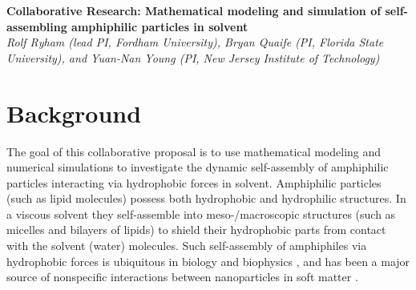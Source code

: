 \noindent
{\bf Collaborative Research: Mathematical modeling and simulation of
self-assembling amphiphilic particles in solvent} \\
{\em Rolf Ryham (lead PI, Fordham University), Bryan Quaife (PI,
Florida State University), and Yuan-Nan Young (PI, New Jersey Institute of Technology)}
\section{Background}
\label{sec:background}
The goal of this collaborative proposal is to use mathematical modeling
and numerical simulations to investigate the dynamic self-assembly of
amphiphilic particles interacting via hydrophobic forces
in solvent. Amphiphilic particles (such as lipid molecules) possess
both hydrophobic and hydrophilic structures. In a viscous solvent they
self-assemble into meso-/macroscopic structures (such as micelles and
bilayers of lipids) to shield their hydrophobic parts from contact with
the solvent (water) molecules.
%
%
Such self-assembly of amphiphiles via hydrophobic forces is ubiquitous in biology and biophysics \cite{Israelachvili1954},
and has been a major source of nonspecific interactions between
nanoparticles in soft matter
\cite{Sanchez-IglesiasEtAl2012_ACSNano,AltantzisEtAl2013_PSC,XieYangLuEtAl2020_COCIS}. 




